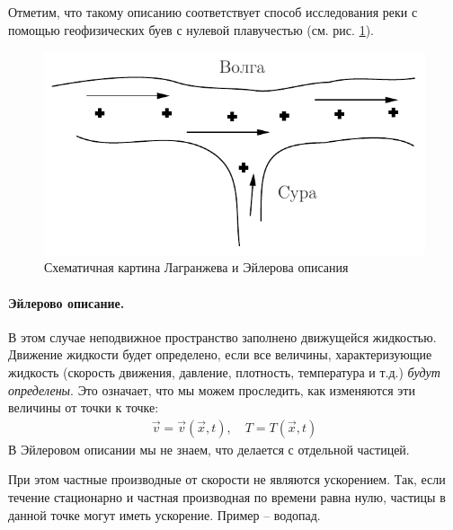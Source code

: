 Отметим, что такому описанию соответствует способ исследования реки с помощью геофизических буев с нулевой плавучестью (см. рис. \ref{fig:figure3}).
\begin{figure}[H]
	\centering
	\includegraphics[scale=1]{photo/3.pdf}
	\caption{Схематичная картина Лагранжева и Эйлерова описания}%
	\label{fig:figure3}
\end{figure}

\paragraph{Эйлерово описание.} В этом случае неподвижное пространство заполнено движущейся жидкостью. Движение жидкости будет определено, если все величины, характеризующие жидкость (скорость движения, давление, плотность, температура и т.д.) \textit{будут определены}.
Это означает, что мы можем проследить, как изменяются эти величины от точки к точке:
\begin{align*} 
	\vec{v} =\vec{v}(\vec{x}, t), \quad
	T = T(\vec{x}, t)
\end{align*}
В Эйлеровом описании мы не знаем, что делается с отдельной частицей. 

При этом частные производные от скорости не являются ускорением. Так, если течение стационарно и частная производная по времени  равна нулю, частицы в данной точке могут иметь ускорение. Пример -- водопад.

